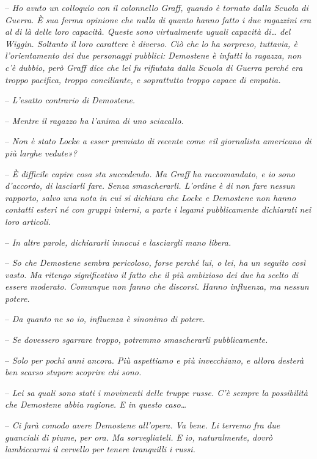 {-- \emph{Ho avuto un colloquio con il colonnello Graff, quando è
		tornato dalla Scuola di Guerra. È sua ferma opinione che nulla di quanto
		hanno fatto i due ragazzini era al di là delle loro capacità. Queste
		sono virtualmente uguali capacità di\ldots{} del Wiggin. Soltanto il
		loro carattere è diverso. Ciò che lo ha sorpreso, tuttavia, è
		l'orientamento dei due personaggi pubblici: Demostene è infatti la
		ragazza, non c'è dubbio, però Graff dice che lei fu rifiutata dalla
		Scuola di Guerra perché era troppo pacifica, troppo conciliante, e
		soprattutto troppo capace di empatia.}}

{-- \emph{L'esatto contrario di Demostene.}}

{-- \emph{Mentre il ragazzo ha l'anima di uno sciacallo.}}

{-- \emph{Non è stato Locke a esser premiato di recente come «il
		giornalista americano di più larghe vedute»?}}

{-- \emph{È difficile capire cosa sta succedendo. Ma Graff ha
		raccomandato, e io sono d'accordo, di lasciarli fare. Senza
		smascherarli. L'ordine è di non fare nessun rapporto, salvo una nota in
		cui si dichiara che Locke e Demostene non hanno contatti esteri né con
		gruppi interni, a parte i legami pubblicamente dichiarati nei loro
		articoli.}}

{-- \emph{In altre parole, dichiararli innocui e lasciargli mano
		libera.}}

{-- \emph{So che Demostene sembra pericoloso, forse perché lui, o lei,
		ha un seguito così vasto. Ma ritengo significativo il fatto che il più
		ambizioso dei due ha scelto di essere moderato. Comunque non fanno che
		discorsi. Hanno influenza, ma nessun potere.}}

{-- \emph{Da quanto ne so io, influenza è sinonimo di potere.}}

{-- \emph{Se dovessero sgarrare troppo, potremmo smascherarli
		pubblicamente.}}

{-- \emph{Solo per pochi anni ancora. Più aspettiamo e più invecchiano,
		e allora desterà ben scarso stupore scoprire chi sono.}}

{-- \emph{Lei sa quali sono stati i movimenti delle truppe russe. C'è
		sempre la possibilità che Demostene abbia ragione. E in questo
		caso\ldots{}}}

{-- \emph{Ci farà comodo avere Demostene all'opera. Va bene. Li terremo
		fra due guanciali di piume, per ora. Ma sorvegliateli. E io,
		naturalmente, dovrò lambiccarmi il cervello per tenere tranquilli i
		russi.}}

